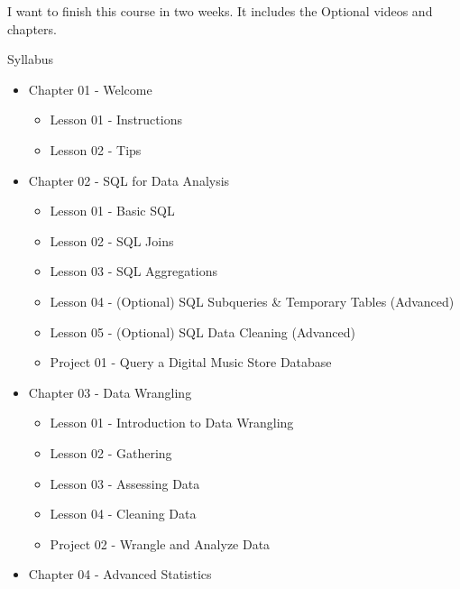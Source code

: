 \documentclass[]{book}
\providecommand{\tightlist}{%
  \setlength{\itemsep}{0pt}\setlength{\parskip}{0pt}}
\begin{document}
I want to finish this course in two weeks. It includes the Optional
videos and chapters.

Syllabus

\begin{itemize}
\tightlist
\item
  Chapter 01 - Welcome

  \begin{itemize}
  \tightlist
  \item
    Lesson 01 - Instructions
  \item
    Lesson 02 - Tips
  \end{itemize}
\item
  Chapter 02 - SQL for Data Analysis

  \begin{itemize}
  \tightlist
  \item
    Lesson 01 - Basic SQL
  \item
    Lesson 02 - SQL Joins
  \item
    Lesson 03 - SQL Aggregations
  \item
    Lesson 04 - (Optional) SQL Subqueries \& Temporary Tables (Advanced)
  \item
    Lesson 05 - (Optional) SQL Data Cleaning (Advanced)
  \item
    Project 01 - Query a Digital Music Store Database
  \end{itemize}
\item
  Chapter 03 - Data Wrangling

  \begin{itemize}
  \tightlist
  \item
    Lesson 01 - Introduction to Data Wrangling
  \item
    Lesson 02 - Gathering
  \item
    Lesson 03 - Assessing Data
  \item
    Lesson 04 - Cleaning Data
  \item
    Project 02 - Wrangle and Analyze Data
  \end{itemize}
\item
  Chapter 04 - Advanced Statistics


\end{itemize}
\end{document}
